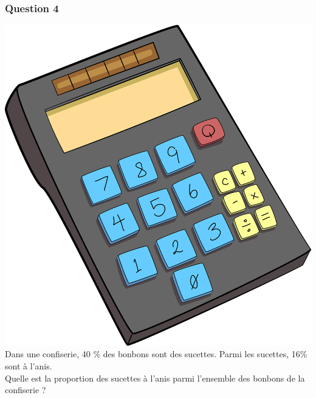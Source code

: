 \documentclass[15pt, mathserif]{beamer}
\begin{document}
\begin{frame} 
	\frametitle{Question 4}
\includegraphics[scale=0.01]{calculatrice} Dans une confiserie, 40 \% des bonbons sont des sucettes. Parmi les sucettes, 16\% sont à l'anis. \\ Quelle est la proportion des sucettes à l'anis parmi l'ensemble des bonbons de la confiserie ?\end{frame}
\end{document}
